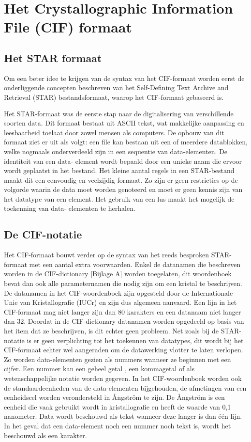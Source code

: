\section{Het Crystallographic Information File (CIF) formaat}

\subsection{Het STAR formaat}
Om een beter idee te krijgen van de syntax van het CIF-formaat worden eerst de onderliggende concepten beschreven van het Self-Defining Text Archive and Retrieval (STAR) bestandsformaat,  waarop het CIF-formaat gebaseerd is. 
\par
Het STAR-formaat was de eerste stap naar de digitalisering van verschillende soorten data. \citep*{CIF2} Dit formaat bestaat uit ASCII tekst, wat makkelijke aanpassing en leesbaarheid toelaat door zowel mensen als computers. De opbouw van dit formaat ziet er uit als volgt: een file kan bestaan uit een of meerdere datablokken, welke nogmaals onderverdeeld zijn in een sequentie van data-elementen. De identiteit van een data- element wordt bepaald door een unieke naam die ervoor wordt geplaatst in het bestand. Het kleine aantal regels in een STAR-bestand maakt dit een eenvoudig en veelzijdig formaat. Zo zijn er geen restricties op de volgorde waarin de data moet worden genoteerd en moet er geen kennis zijn van het datatype van een element. Het gebruik van een lus maakt het mogelijk de toekenning van data- elementen te herhalen.

\subsection{De CIF-notatie}   
Het CIF-formaat bouwt verder op de syntax van het reeds besproken STAR-formaat met een aantal extra voorwaarden. Enkel de datanamen die beschreven worden in de CIF-dictionary [Bijlage A] worden toegelaten, dit woordenboek bevat dan ook alle parameternamen die nodig zijn om een kristal te beschrijven. De datanamen in het CIF-woordenboek zijn opgesteld door de Internationale Unie van Kristallografie (IUCr) en zijn dus algemeen aanvaard. Een lijn in het CIF-formaat mag niet langer zijn dan 80 karakters en een datanaam niet langer dan 32. Doordat in de CIF-dictionary datanamen worden opgedeeld op basis van het item dat ze beschrijven, is dit echter geen probleem. Net zoals bij de STAR-notatie is er geen verplichting tot het toekennen van datatypes, dit wordt bij het CIF-formaat echter wel aangeraden om de datawerking vlotter te laten verlopen. Zo worden data-elementen gezien als nummers wanneer ze beginnen met een cijfer. Een nummer kan een geheel getal , een kommagetal of als wetenschappelijke notatie worden gegeven. In het CIF-woordenboek worden ook de standaardeenheden van de data-elementen bijgehouden, de afmetingen van een eenheidscel worden verondersteld in Ångström te zijn. De Ångström is een eenheid die vaak gebruikt wordt in kristallografie en heeft de waarde van 0,1 nanometer. Data wordt beschouwd als tekst wanneer deze langer is dan één lijn. In het geval dat een data-element noch een nummer noch tekst is, wordt het beschouwd als een karakter. 

